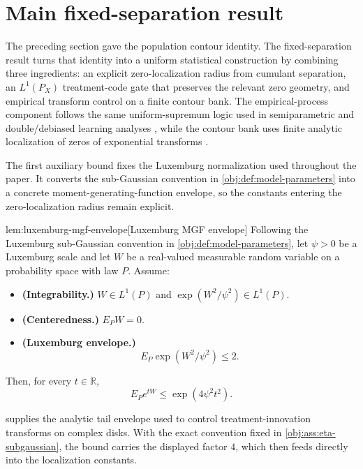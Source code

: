 \section{Main fixed-separation result}

The preceding section gave the population contour identity. The fixed-separation result turns that identity into a uniform statistical construction by combining three ingredients: an explicit zero-localization radius from cumulant separation, an \(L^1(P_X)\) treatment-code gate that preserves the relevant zero geometry, and empirical transform control on a finite contour bank. The empirical-process component follows the same uniform-supremum logic used in semiparametric and double/debiased learning analyses \citep{BickelKlaassenRitovWellner1993,VanDerVaart1998,VanDerVaartWellner1996,ChernozhukovEtAl2018DML}, while the contour bank uses finite analytic localization of zeros of exponential transforms \citep{MichelenSahasrabudhe2019,EremenkoFryntov2021,DinhGhoshTranTran2021}.

The first auxiliary bound fixes the Luxemburg normalization used throughout the paper. It converts the sub-Gaussian convention in \cref{obj:def:model-parameters} into a concrete moment-generating-function envelope, so the constants entering the zero-localization radius remain explicit.

\begin{lemmav}{lem:luxemburg-mgf-envelope}[Luxemburg MGF envelope]
Following the Luxemburg sub-Gaussian convention in \cref{obj:def:model-parameters}, let \(\psi>0\) be a Luxemburg scale and let \(W\) be a real-valued measurable random variable on a probability space with law \(P\). Assume:
\begin{itemize}
\item \textbf{(Integrability.)} \(W\in L^1(P)\) and \(\exp(W^2/\psi^2)\in L^1(P)\).
\item \textbf{(Centeredness.)} \(E_P W=0\).
\item \textbf{(Luxemburg envelope.)}
\[
E_P\exp(W^2/\psi^2)\le 2.
\]
\end{itemize}
Then, for every \(t\in\mathbb R\),
\[
E_P e^{tW}\le \exp(4\psi^2t^2).
\]
\end{lemmav}

 supplies the analytic tail envelope used to control treatment-innovation transforms on complex disks. With the exact convention fixed in \cref{obj:ass:eta-subgaussian}, the bound carries the displayed factor \(4\), which then feeds directly into the localization constants.


